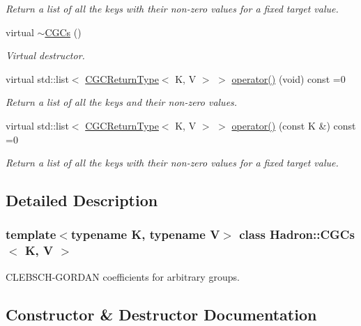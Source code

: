 \begin{DoxyCompactItemize}
\begin{DoxyCompactList}\small\item\em Return a list of all the keys with their non-\/zero values for a fixed target value. \end{DoxyCompactList}\item 
virtual \mbox{\hyperlink{classHadron_1_1CGCs_a882c1ea3451254725b9d86c598d6c29a}{$\sim$\+C\+G\+Cs}} ()
\begin{DoxyCompactList}\small\item\em Virtual destructor. \end{DoxyCompactList}\item 
virtual std\+::list$<$ \mbox{\hyperlink{structHadron_1_1CGCReturnType}{C\+G\+C\+Return\+Type}}$<$ K, V $>$ $>$ \mbox{\hyperlink{classHadron_1_1CGCs_ac709374b31c0319e82028b9d7c23e993}{operator()}} (void) const =0
\begin{DoxyCompactList}\small\item\em Return a list of all the keys and their non-\/zero values. \end{DoxyCompactList}\item 
virtual std\+::list$<$ \mbox{\hyperlink{structHadron_1_1CGCReturnType}{C\+G\+C\+Return\+Type}}$<$ K, V $>$ $>$ \mbox{\hyperlink{classHadron_1_1CGCs_a8d2d80be37b603359708ebdd5923ff47}{operator()}} (const K \&) const =0
\begin{DoxyCompactList}\small\item\em Return a list of all the keys with their non-\/zero values for a fixed target value. \end{DoxyCompactList}\end{DoxyCompactItemize}


\subsection{Detailed Description}
\subsubsection*{template$<$typename K, typename V$>$\newline
class Hadron\+::\+C\+G\+Cs$<$ K, V $>$}

C\+L\+E\+B\+S\+C\+H-\/\+G\+O\+R\+D\+AN coefficients for arbitrary groups. 

\subsection{Constructor \& Destructor Documentation}
\mbox{\label{classHadron_1_1CGCs_a882c1ea3451254725b9d86c598d6c29a}} 
